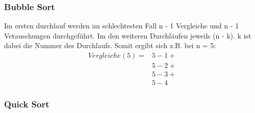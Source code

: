 \documentclass[a4paper, 11pt]{article}
\begin{document}
\subsubsection*{Bubble Sort}

Im ersten durchlauf werden im schlechtesten Fall n - 1 Vergleiche und n - 1 Vetauschungen durchgeführt.
Im den weiteren Durchläufen jeweils (n - k). k ist dabei die Nummer des Durchlaufs. Somit ergibt sich z.B. bei n = 5: \\

\begin{equation*}
\begin{split}
Vergleiche(5) = & 5 - 1 + \\
                & 5 - 2 + \\
                & 5 - 3 + \\
                & 5 - 4
\end{split}
\end{equation*}


\subsubsection*{Quick Sort}
\end{document}
